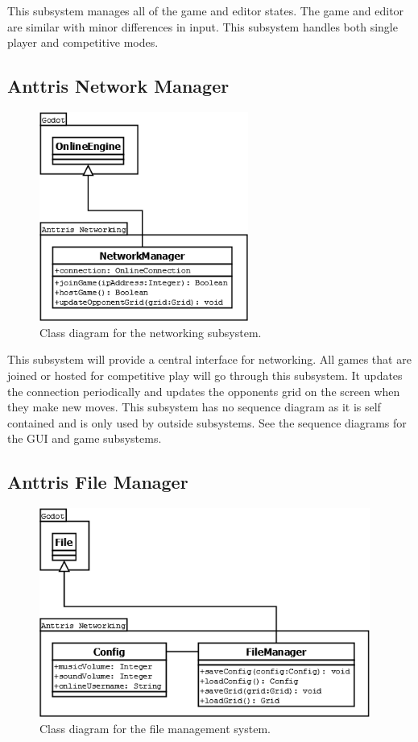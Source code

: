 \documentclass[12pt]{article}
\begin{document}
This subsystem manages all of the game and editor states. The game and editor are similar with minor differences in input. This subsystem handles both single player and competitive modes.

\subsection{Anttris Network Manager} %
    \begin{figure}[H]
        \centering
        \includegraphics[width=2.7in]{Anttris_NetworkingClass.png}
        \caption{Class diagram for the networking subsystem.}
    \end{figure}

This subsystem will provide a central interface for networking. All games that are joined or hosted for competitive play will go through this subsystem. It updates the connection periodically and updates the opponents grid on the screen when they make new moves. This subsystem has no sequence diagram as it is self contained and is only used by outside subsystems. See the sequence diagrams for the GUI and game subsystems.

\subsection{Anttris File Manager} %
    \begin{figure}[H]
        \centering
        \includegraphics[width=4.27in]{Anttris_FileClass.png}
        \caption{Class diagram for the file management system.}
    \end{figure}
\end{document}
